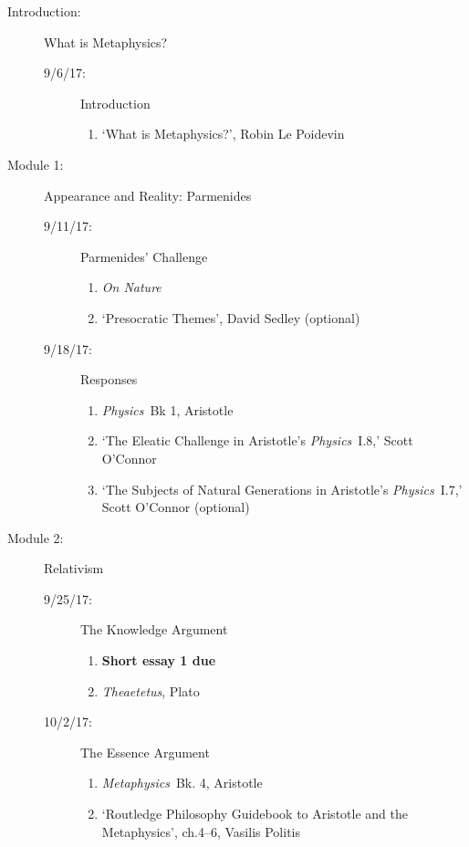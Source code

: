 \documentclass[article,oneside]{memoir}
\begin{document}
\begin{description}
\item[Introduction:]  What  is Metaphysics? 
\begin{description}
\item [9/6/17:] Introduction
\begin{enumerate}
\item `What is Metaphysics?', Robin Le Poidevin
\end{enumerate}
\end{description}

\item[Module 1:] Appearance and Reality: Parmenides 
\begin{description}
\item [9/11/17:] Parmenides' Challenge
\begin{enumerate}
\item \emph{On Nature}
\item `Presocratic Themes', David Sedley (optional)
\end{enumerate}

\item [9/18/17:] Responses 
\begin{enumerate}
\item \emph{Physics}\ Bk 1, Aristotle
\item `The Eleatic Challenge in Aristotle's \emph{Physics}\ I.8,' Scott O'Connor 
\item `The Subjects of Natural Generations in Aristotle's \emph{Physics}\ I.7,' Scott O'Connor (optional)
\end{enumerate}
\end{description}

\item[Module 2:] Relativism
\begin{description}
\item [9/25/17:] The Knowledge Argument
\begin{enumerate}
\item \textbf{Short essay 1 due}
\item \emph{Theaetetus}, Plato
\end{enumerate}

\item[10/2/17:] The Essence Argument
\begin{enumerate}
\item \emph{Metaphysics}\ Bk. 4, Aristotle
\item `Routledge Philosophy Guidebook to Aristotle and the Metaphysics', ch.4--6, Vasilis Politis
\end{enumerate}


\end{description}
\end{description}
\end{document}
